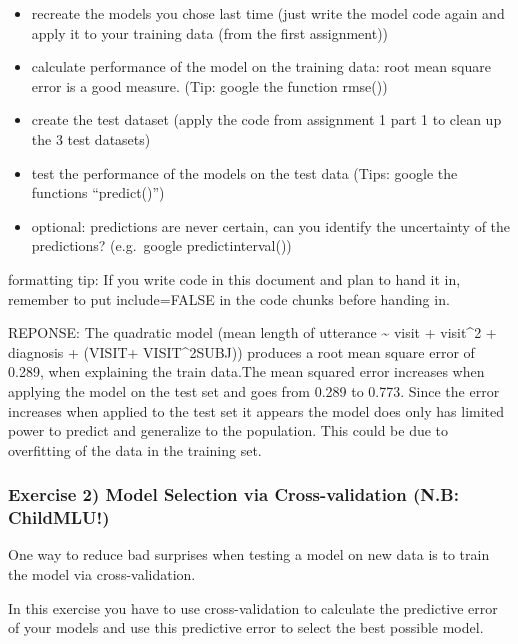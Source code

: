 \documentclass[]{article}
\begin{document}
\begin{itemize}
\item
  recreate the models you chose last time (just write the model code
  again and apply it to your training data (from the first assignment))
\item
  calculate performance of the model on the training data: root mean
  square error is a good measure. (Tip: google the function rmse())
\item
  create the test dataset (apply the code from assignment 1 part 1 to
  clean up the 3 test datasets)
\item
  test the performance of the models on the test data (Tips: google the
  functions ``predict()'')
\item
  optional: predictions are never certain, can you identify the
  uncertainty of the predictions? (e.g.~google predictinterval())
\end{itemize}

formatting tip: If you write code in this document and plan to hand it
in, remember to put include=FALSE in the code chunks before handing in.

REPONSE: The quadratic model (mean length of utterance \textasciitilde{}
visit + visit\^{}2 + diagnosis + (VISIT+ VISIT\^{}2\textbar{}SUBJ))
produces a root mean square error of 0.289, when explaining the train
data.The mean squared error increases when applying the model on the
test set and goes from 0.289 to 0.773. Since the error increases when
applied to the test set it appears the model does only has limited power
to predict and generalize to the population. This could be due to
overfitting of the data in the training set.

\subsubsection{Exercise 2) Model Selection via Cross-validation (N.B:
ChildMLU!)}\label{exercise-2-model-selection-via-cross-validation-n.b-childmlu}

One way to reduce bad surprises when testing a model on new data is to
train the model via cross-validation.

In this exercise you have to use cross-validation to calculate the
predictive error of your models and use this predictive error to select
the best possible model.
\end{document}
